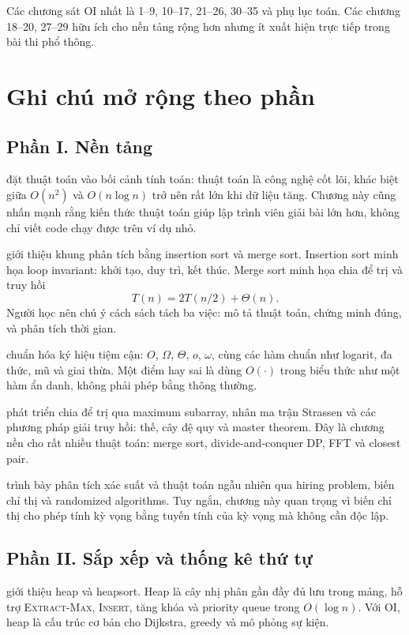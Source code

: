 \documentclass[11pt]{article}
\begin{document}
Các chương sát OI nhất là 1--9, 10--17, 21--26, 30--35 và phụ lục toán. Các
chương 18--20, 27--29 hữu ích cho nền tảng rộng hơn nhưng ít xuất hiện trực
tiếp trong bài thi phổ thông.

\section{Ghi chú mở rộng theo phần}

\subsection*{Phần I. Nền tảng}

 đặt thuật toán vào bối cảnh tính toán: thuật toán là công nghệ
cốt lõi, khác biệt giữa \(O(n^2)\) và \(O(n\log n)\) trở nên rất lớn khi dữ liệu
tăng. Chương này cũng nhấn mạnh rằng kiến thức thuật toán giúp lập trình viên
giải bài lớn hơn, không chỉ viết code chạy được trên ví dụ nhỏ.

 giới thiệu khung phân tích bằng insertion sort và merge sort.
Insertion sort minh họa loop invariant: khởi tạo, duy trì, kết thúc. Merge sort
minh họa chia để trị và truy hồi
\[
  T(n)=2T(n/2)+\Theta(n).
\]
Người học nên chú ý cách sách tách ba việc: mô tả thuật toán, chứng minh đúng,
và phân tích thời gian.

 chuẩn hóa ký hiệu tiệm cận: \(O\), \(\Omega\), \(\Theta\),
\(o\), \(\omega\), cùng các hàm chuẩn như logarit, đa thức, mũ và giai thừa.
Một điểm hay sai là dùng \(O(\cdot)\) trong biểu thức như một hàm ẩn danh, không
phải phép bằng thông thường.

 phát triển chia để trị qua maximum subarray, nhân ma trận
Strassen và các phương pháp giải truy hồi: thế, cây đệ quy và master theorem.
Đây là chương nền cho rất nhiều thuật toán: merge sort, divide-and-conquer DP,
FFT và closest pair.

 trình bày phân tích xác suất và thuật toán ngẫu nhiên qua hiring
problem, biến chỉ thị và randomized algorithms. Tuy ngắn, chương này quan
trọng vì biến chỉ thị cho phép tính kỳ vọng bằng tuyến tính của kỳ vọng mà
không cần độc lập.

\subsection*{Phần II. Sắp xếp và thống kê thứ tự}

 giới thiệu heap và heapsort. Heap là cây nhị phân gần đầy đủ
lưu trong mảng, hỗ trợ \textsc{Extract-Max}, \textsc{Insert}, tăng khóa và priority
queue trong \(O(\log n)\). Với OI, heap là cấu trúc cơ bản cho Dijkstra, greedy
và mô phỏng sự kiện.
\end{document}

